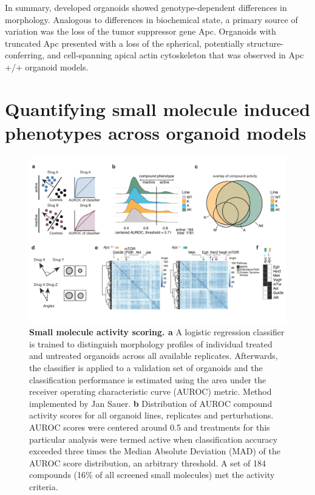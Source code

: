 \begin{flushleft}
In summary, developed organoids showed genotype-dependent differences in morphology. Analogous to differences in biochemical state, a primary source of variation was the loss of the tumor suppressor gene Apc. Organoids with truncated Apc presented with a loss of the spherical, potentially structure-conferring, and cell-spanning apical actin cytoskeleton that was observed in Apc +/+ organoid models.

\section{Quantifying small molecule induced phenotypes across organoid models}

\begin{figure}[H]
\centering
\includegraphics[width=\textwidth,
                height=\textheight,
                keepaspectratio]{figures/adenomaprofiling/pdf/fig_1_5.pdf}
\caption{\textbf{Small molecule activity scoring. a} A logistic regression classifier is trained to distinguish morphology profiles of individual treated and untreated organoids across all available replicates. Afterwards, the classifier is applied to a validation set of organoids and the classification performance is estimated using the area under the receiver operating characteristic curve (AUROC) metric. Method implemented by Jan Sauer.
\textbf{b} Distribution of AUROC compound activity scores for all organoid lines, replicates and perturbations. AUROC scores were centered around 0.5 and treatments for this particular analysis were termed active when classification accuracy exceeded three times the Median Absolute Deviation (MAD) of the AUROC score distribution, an arbitrary threshold. A set of 184 compounds (16\% of all screened small molecules) met the activity criteria. 
}
\end{figure}
\end{flushleft}

